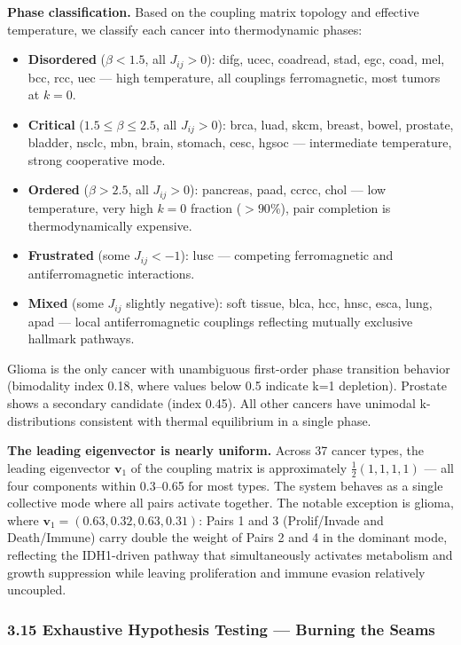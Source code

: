 \documentclass[
  11pt,
]{article}
\providecommand{\tightlist}{%
  \setlength{\itemsep}{0pt}\setlength{\parskip}{0pt}}
\begin{document}
\textbf{Phase classification.} Based on the coupling matrix topology and
effective temperature, we classify each cancer into thermodynamic
phases:

\begin{itemize}
\tightlist
\item
  \textbf{Disordered} (\(\beta < 1.5\), all \(J_{ij} > 0\)): difg, ucec,
  coadread, stad, egc, coad, mel, bcc, rcc, uec --- high temperature,
  all couplings ferromagnetic, most tumors at \(k = 0\).
\item
  \textbf{Critical} (\(1.5 \leq \beta \leq 2.5\), all \(J_{ij} > 0\)):
  brca, luad, skcm, breast, bowel, prostate, bladder, nsclc, mbn, brain,
  stomach, cesc, hgsoc --- intermediate temperature, strong cooperative
  mode.
\item
  \textbf{Ordered} (\(\beta > 2.5\), all \(J_{ij} > 0\)): pancreas,
  paad, ccrcc, chol --- low temperature, very high \(k = 0\) fraction
  (\(>90\%\)), pair completion is thermodynamically expensive.
\item
  \textbf{Frustrated} (some \(J_{ij} < -1\)): lusc --- competing
  ferromagnetic and antiferromagnetic interactions.
\item
  \textbf{Mixed} (some \(J_{ij}\) slightly negative): soft tissue, blca,
  hcc, hnsc, esca, lung, apad --- local antiferromagnetic couplings
  reflecting mutually exclusive hallmark pathways.
\end{itemize}

Glioma is the only cancer with unambiguous first-order phase transition
behavior (bimodality index 0.18, where values below 0.5 indicate k=1
depletion). Prostate shows a secondary candidate (index 0.45). All other
cancers have unimodal k-distributions consistent with thermal
equilibrium in a single phase.

\textbf{The leading eigenvector is nearly uniform.} Across 37 cancer
types, the leading eigenvector \(\mathbf{v}_1\) of the coupling matrix
is approximately \(\frac{1}{2}(1, 1, 1, 1)\) --- all four components
within 0.3--0.65 for most types. The system behaves as a single
collective mode where all pairs activate together. The notable exception
is glioma, where \(\mathbf{v}_1 = (0.63, 0.32, 0.63, 0.31)\): Pairs 1
and 3 (Prolif/Invade and Death/Immune) carry double the weight of Pairs
2 and 4 in the dominant mode, reflecting the IDH1-driven pathway that
simultaneously activates metabolism and growth suppression while leaving
proliferation and immune evasion relatively uncoupled.

\subsubsection{3.15 Exhaustive Hypothesis Testing --- Burning the
Seams}\label{exhaustive-hypothesis-testing-burning-the-seams}
\end{document}
